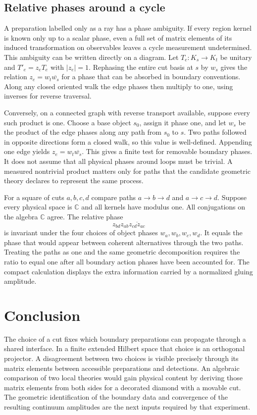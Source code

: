 \documentclass[11pt,letterpaper]{article}
\newcommand{\CC}{\mathbb C}
\begin{document}
\subsection{Relative phases around a cycle}
A preparation labelled only as a ray has a phase ambiguity. If every
region kernel is known only up to a scalar phase, even a full set of
matrix elements of its induced transformation on observables leaves a
cycle measurement undetermined. This ambiguity can be written directly
on a diagram. Let \(T_e:K_s\to K_t\) be unitary and
\(T'_e=z_eT_e\) with \(|z_e|=1\). Rephasing the entire cut basis at \(s\)
by \(w_s\) gives the relation \(z_e=w_t\overline{w_s}\) for a phase
that can be absorbed in boundary conventions. Along any closed oriented
walk the edge phases then multiply to one, using inverses for reverse
traversal.

Conversely, on a connected graph with reverse transport available, suppose
every such product is one. Choose a base object \(s_0\), assign it phase
one, and let \(w_s\) be the product of the edge phases along any path
from \(s_0\) to \(s\). Two paths followed in opposite directions form
a closed walk, so this value is well-defined. Appending one edge yields
\(z_e=w_t\overline{w_s}\). This gives a finite test for removable boundary
phases. It does not assume that all physical phases around loops must be
trivial. A measured nontrivial product matters only for paths that the
candidate geometric theory declares to represent the same process.

For a square of cuts \(a,b,c,d\) compare paths \(a\to b\to d\) and
\(a\to c\to d\). Suppose every physical space is \(\CC\) and all kernels
have modulus one. All conjugations on the algebra \(\CC\) agree. The
relative phase
\[
 z_{bd}z_{ab}\overline{z_{cd}z_{ac}}
\]
is invariant under the four choices of object phases \(w_a,w_b,w_c,w_d\).
It equals the phase that would appear between coherent alternatives
through the two paths. Treating the paths as one and the same geometric
decomposition requires the ratio to equal one after all boundary action
phases have been accounted for. The compact calculation displays the
extra information carried by a normalized gluing amplitude.

\section{Conclusion}
The choice of a cut fixes which boundary preparations can propagate through
a shared interface. In a finite extended Hilbert space that choice is an
orthogonal projector. A disagreement between two choices is visible
precisely through its matrix elements between accessible preparations and
detections. An algebraic comparison of two local theories would gain physical
content by deriving those matrix elements from both sides for a decorated
diamond with a movable cut. The geometric identification of the boundary
data and convergence of the resulting continuum amplitudes are the next
inputs required by that experiment.
\end{document}
